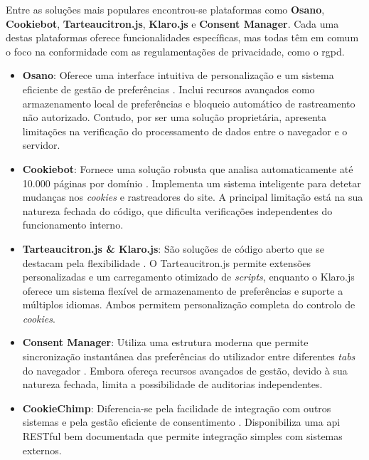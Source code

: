 Entre as soluções mais populares encontrou-se plataformas como \textbf{Osano}, \textbf{Cookiebot}, \textbf{Tarteaucitron.js}, \textbf{Klaro.js} e \textbf{Consent Manager}. Cada uma destas plataformas oferece funcionalidades específicas, mas todas têm em comum o foco na conformidade com as regulamentações de privacidade, como o \acrshort{rgpd}.

\begin{itemize}
    \item \textbf{Osano}: Oferece uma interface intuitiva de personalização e um sistema eficiente de gestão de preferências \cite{osano}. Inclui recursos avançados como armazenamento local de preferências e bloqueio automático de rastreamento não autorizado. Contudo, por ser uma solução proprietária, apresenta limitações na verificação do processamento de dados entre o navegador e o servidor.

    \item \textbf{Cookiebot}: Fornece uma solução robusta que analisa automaticamente até 10.000 páginas por domínio \cite{Cookiebot2024}. Implementa um sistema inteligente para detetar mudanças nos \textit{cookies} e rastreadores do site. A principal limitação 
    está na sua natureza fechada do código, que dificulta verificações independentes do funcionamento interno.

    \item \textbf{Tarteaucitron.js \& Klaro.js}: São soluções de código aberto que se destacam pela flexibilidade \cite{tarteaucitron}. O Tarteaucitron.js permite extensões personalizadas e um carregamento otimizado de \textit{scripts}, enquanto o Klaro.js oferece um sistema flexível de armazenamento de preferências e suporte a múltiplos idiomas. Ambos permitem personalização completa do controlo de \textit{cookies}.

    \item \textbf{Consent Manager}: Utiliza uma estrutura moderna que permite sincronização instantânea das preferências do utilizador entre diferentes \textit{tabs} do navegador \cite{ConsentManager2024}. Embora ofereça recursos avançados de gestão, devido à sua natureza fechada, limita a possibilidade de auditorias independentes.

    \item \textbf{CookieChimp}: Diferencia-se pela facilidade de integração com outros sistemas e pela gestão eficiente de consentimento \cite{CookieChimp2024}. Disponibiliza uma \acrshort{api} RESTful bem documentada que permite integração simples com sistemas externos.
\end{itemize}


